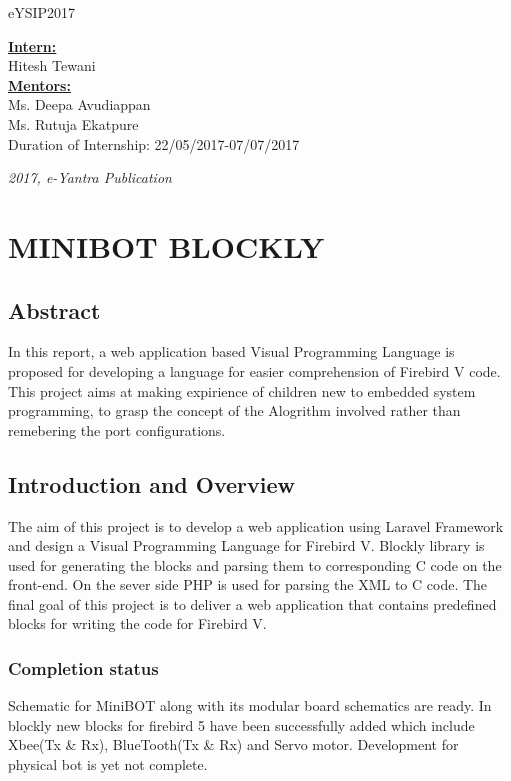 \documentclass[a4paper,12pt,oneside]{book}
\begin{document}
\begin{titlepage}
\raggedright
{\Large eYSIP2017\\[1cm]}
{\Huge\scshape {}}
\vfill
\begin{flushright}
{\large\textbf{\underline {Intern:}\\}}
{\large Hitesh Tewani \\}
{\large\textbf{\underline {Mentors:}\\}}
{\large Ms. Deepa Avudiappan \\}
{\large Ms. Rutuja Ekatpure \\}
{\large Duration of Internship:   22/05/2017-07/07/2017  \\}
\end{flushright}

{\itshape 2017, e-Yantra Publication}
\end{titlepage}

\chapter[Project Tag]{MINIBOT BLOCKLY}
\section*{Abstract}
In this report, a web application based Visual Programming Language is proposed for developing a language for easier comprehension of Firebird V code.
This project aims at making expirience of children new to embedded system programming, to grasp the concept of the Alogrithm involved rather than remebering the port conﬁgurations.

\section{Introduction and Overview}
The aim of this project is to develop a web application using Laravel Framework and design a Visual Programming Language for Firebird V. Blockly library is used for generating the blocks and parsing them to corresponding C code on the front-end. On the sever side PHP is used for parsing the XML to C code. The ﬁnal goal of this project is to deliver a web application that contains predeﬁned
blocks for writing the code for Firebird V.

\subsection*{Completion status}
Schematic for MiniBOT along with its modular board schematics are ready. In blockly new blocks for firebird 5 have been successfully added which include Xbee(Tx & Rx), BlueTooth(Tx & Rx) and Servo motor. Development for physical bot is yet not complete.
\end{document}
